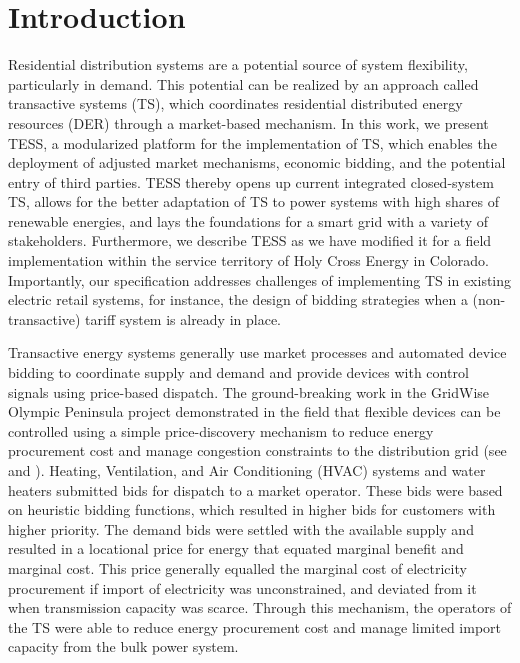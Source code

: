 \section{Introduction}

Residential distribution systems are a potential source of system flexibility, particularly in demand. This potential can be realized by an approach called transactive systems (TS), which  coordinates residential distributed energy resources (DER) through a market-based mechanism. 
In this work, we present TESS, a modularized platform for the implementation of TS, which enables the deployment of adjusted market mechanisms, economic bidding, and the potential entry of third parties. TESS thereby opens up current integrated closed-system TS, allows for the better adaptation of TS to power systems with high shares of renewable energies, and lays the foundations for a smart grid with a variety of stakeholders.
Furthermore, we describe TESS as we have modified it for a field implementation within the service territory of Holy Cross Energy in Colorado. Importantly, our specification addresses challenges of implementing TS in existing electric retail systems, for instance, the design of bidding strategies when a (non-transactive) tariff system is already in place.

Transactive energy systems generally use market processes and automated device bidding to coordinate supply and demand and provide devices with control signals using price-based dispatch. The ground-breaking work in the GridWise Olympic Peninsula project demonstrated in the field that flexible devices can be controlled using a simple price-discovery mechanism to reduce energy procurement cost and manage congestion constraints to the distribution grid (see \citet{PNNL2006} and \citet{hammerstrom_2008}). Heating, Ventilation, and Air Conditioning (HVAC) systems and water heaters submitted bids for dispatch to a market operator. These bids were based on heuristic bidding functions, which resulted in higher bids for customers with higher priority.
The demand bids were settled with the available supply and resulted in a locational price for energy that equated marginal benefit and marginal cost. 
This price generally equalled the marginal cost of electricity procurement if import of electricity was unconstrained, and deviated from it when transmission capacity was scarce. Through this mechanism, the operators of the TS were able to reduce energy procurement cost and manage limited import capacity from the bulk power system.

